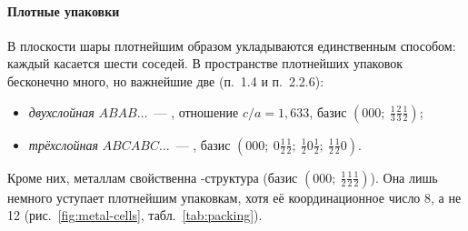\paragraph{Плотные упаковки}
В плоскости шары плотнейшим образом укладываются единственным способом:
каждый касается шести соседей. В пространстве плотнейших упаковок
бесконечно много, но важнейшие две (п.~1.4 и п.~2.2.6):
\begin{itemize}
\item \emph{двухслойная} $ABAB\ldots$~— , отношение $c/a=1{,}633$,
базис $(000;\ \frac13\frac23\frac12)$;
\item \emph{трёхслойная} $ABCABC\ldots$~— , базис
$(000;\ 0\frac12\frac12;\ \frac120\frac12;\ \frac12\frac120)$.
\end{itemize}
Кроме них, металлам свойственна -структура (базис
$(000;\ \frac12\frac12\frac12)$). Она лишь немного уступает плотнейшим
упаковкам, хотя её координационное число 8, а не 12 (рис.~\ref{fig:metal-cells},
табл.~\ref{tab:packing}).

